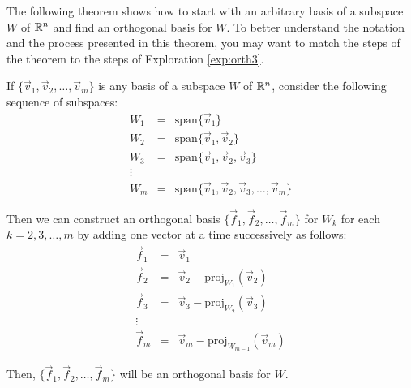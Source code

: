 \documentclass{ximera}
\begin{document}

The following theorem shows how to start with an arbitrary basis of a subspace $W$ of $\mathbb{R}^n$ and find an orthogonal basis for $W$.  To better understand the notation and the process presented in this theorem, you may want to match the steps of the theorem to the steps of Exploration \ref{exp:orth3}.

\begin{theorem} \label{th:GS}
If $\{\vec{v}_{1}, \vec{v}_{2}, \dots , \vec{v}_{m}\}$ is any basis of a subspace $W$ of $\mathbb{R}^n$, consider the following sequence of subspaces:
\begin{equation*}
\begin{array}{ccl}
W_1&=&\mbox{span}\{\vec{v}_{1}\} \\
W_2&=&\mbox{span}\{\vec{v}_{1},\vec{v}_{2}\} \\
W_3&=&\mbox{span}\{\vec{v}_{1},\vec{v}_{2},\vec{v}_{3}\} \\
\vdots &&\\
W_m &=& \mbox{span}\{\vec{v}_{1},\vec{v}_{2},\vec{v}_{3},\ldots,\vec{v}_{m}\}
\end{array}
\end{equation*}

Then we can construct an orthogonal basis $\{\vec{f}_{1},\vec{f}_{2},\ldots,\vec{f}_{m}\}$ for $W_k$ for each $k = 2, 3, \dots , m$ by adding one vector at a time successively as follows:
\begin{equation*}
\begin{array}{ccl}
\vec{f}_{1} &=& \vec{v}_{1} \\
\vec{f}_{2} &=& \vec{v}_{2} - \mbox{proj}_{W_1}(\vec{v}_2) \\
\vec{f}_{3} &=& \vec{v}_{3} - \mbox{proj}_{W_2}(\vec{v}_3) \\
\vdots &&\\
\vec{f}_{m} &=& \vec{v}_{m} - \mbox{proj}_{W_{m-1}}(\vec{v}_m)
\end{array}
\end{equation*}

Then, $\{\vec{f}_{1},\vec{f}_{2},\ldots,\vec{f}_{m}\}$ will be an orthogonal basis for $W$.  %


\end{theorem}
\end{document}
